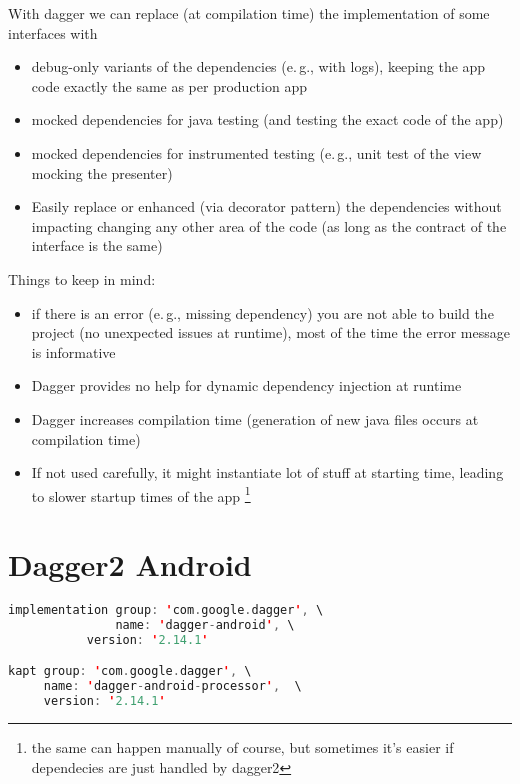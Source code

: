 \documentclass[10pt]{beamer}
\providecommand{\eg}{e.\,g.}
\begin{document}
	\begin{frame}[fragile]
\begin{lstlisting}[language=Kotlin, basicstyle=\ttfamily]
\end{lstlisting} 
\end{frame}
\begin{frame}
	With dagger we can replace (at compilation time) the implementation of some interfaces with
	\begin{itemize}
		\item debug-only variants of the dependencies (\eg, with logs), keeping the app code exactly the same as per production app 
		\item mocked dependencies for java testing (and testing the exact code of the app) 
		\item mocked dependencies for instrumented testing  (\eg, unit test of the view mocking the presenter)  
		\item Easily replace or enhanced (via decorator pattern) the dependencies without impacting changing any other area of the code (as long as the contract of the interface is the same) 
	\end{itemize}
			
\end{frame}
\begin{frame}
	Things to keep in mind:
	\begin{itemize}
		\item if there is an error (\eg, missing dependency) you are not able to build the project (no unexpected issues at runtime), most of the time the error message is informative
		\item Dagger provides no help for dynamic dependency injection at runtime 
		\item Dagger increases compilation time (generation of new java files occurs at compilation time)
		\item If not used carefully, it might instantiate lot of stuff at starting time, leading to slower startup times of the app%
			\footnote{the same can happen manually of course, but sometimes it's easier if dependecies are just handled by dagger2}
	\end{itemize}
\end{frame}

	\section{Dagger2 Android }

\begin{frame}[fragile]
\begin{lstlisting}[language=Kotlin, basicstyle=\ttfamily]
implementation group: 'com.google.dagger', \
               name: 'dagger-android', \
	       version: '2.14.1'

kapt group: 'com.google.dagger', \
     name: 'dagger-android-processor',  \
     version: '2.14.1'
\end{lstlisting} 
\end{frame}
\end{document}
